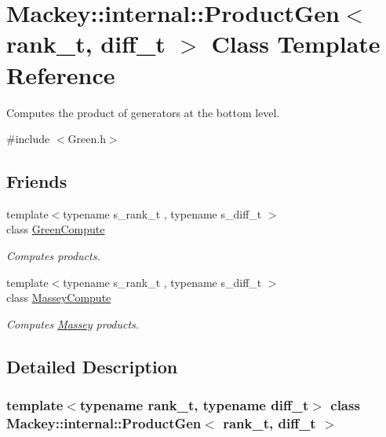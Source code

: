 \hypertarget{classMackey_1_1internal_1_1ProductGen}{}\section{Mackey\+:\+:internal\+:\+:Product\+Gen$<$ rank\+\_\+t, diff\+\_\+t $>$ Class Template Reference}
\label{classMackey_1_1internal_1_1ProductGen}


Computes the product of generators at the bottom level.  




{\ttfamily \#include $<$Green.\+h$>$}

\subsection*{Friends}
\begin{DoxyCompactItemize}
\item 
{\footnotesize template$<$typename s\+\_\+rank\+\_\+t , typename s\+\_\+diff\+\_\+t $>$ }\\class \hyperlink{classMackey_1_1internal_1_1ProductGen_a85de7c4aeeee34981e2020c2f9ddd3e2}{Green\+Compute}
\begin{DoxyCompactList}\small\item\em Computes products. \end{DoxyCompactList}\item 
{\footnotesize template$<$typename s\+\_\+rank\+\_\+t , typename s\+\_\+diff\+\_\+t $>$ }\\class \hyperlink{classMackey_1_1internal_1_1ProductGen_af259bfb9b4dced17104ac8fbb697355c}{Massey\+Compute}
\begin{DoxyCompactList}\small\item\em Computes \hyperlink{classMackey_1_1Massey}{Massey} products. \end{DoxyCompactList}\end{DoxyCompactItemize}


\subsection{Detailed Description}
\subsubsection*{template$<$typename rank\+\_\+t, typename diff\+\_\+t$>$\newline
class Mackey\+::internal\+::\+Product\+Gen$<$ rank\+\_\+t, diff\+\_\+t $>$}

